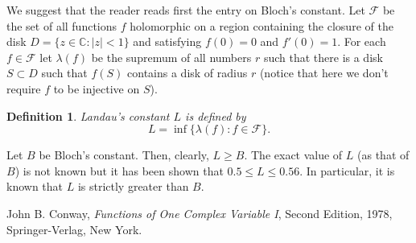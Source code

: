 \documentclass[12pt]{article}
\newtheorem*{defn}{Definition}
\theoremstyle{definition}
\begin{document}
We suggest that the reader reads first the entry on Bloch's constant. Let $\mathcal{F}$ be the set of all functions $f$ holomorphic on a region containing the
closure of the disk $D=\{z\in\mathbb{C}:|z|<1\}$ and satisfying
$f(0)=0$ and $f'(0)=1$. For each $f\in\mathcal{F}$ let $\lambda(f)$
be the supremum of all numbers $r$ such that there is a disk
$S\subset D$ such that $f(S)$ contains a disk of radius $r$ (notice that here we don't require $f$ to be injective on $S$).

\begin{defn}
Landau's constant $L$ is defined by 
$$L=\inf \{ \lambda(f) : f\in \mathcal{F}\}.$$
\end{defn}

Let $B$ be Bloch's constant. Then, clearly, $L\geq B$. The exact value of $L$ (as that of $B$) is not known but it has been shown that $0.5 \leq L \leq 0.56$. In particular, it is known that $L$ is strictly greater than $B$.

\begin{thebibliography}{00}

 John B. Conway, {\em Functions of One Complex
Variable I}, Second Edition, 1978, Springer-Verlag, New York.

\end{thebibliography}
\end{document}
